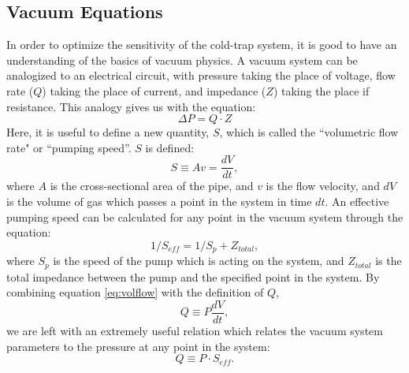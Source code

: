 \documentclass[12pt]{article}
\begin{document}
\subsection{Vacuum Equations}
In order to optimize the sensitivity of the cold-trap system, it is good to have an understanding of the basics of vacuum physics. A vacuum system can be analogized to an electrical circuit, with pressure taking the place of voltage, flow rate ($Q$) taking the place of current, and impedance ($Z$) taking the place if resistance.  This analogy gives us with the equation:
\begin{equation}
\label{eq:vaclaw1}
\Delta P = Q\cdot Z
\end{equation} 
Here, it is useful to define a new quantity, $S$, which is called the ``volumetric flow rate" or ``pumping speed''. $S$ is defined: 
\begin{equation}
\label{ep:volflow}
S \equiv Av = \frac{dV}{dt}, 
\end{equation}
where $A$ is the cross-sectional area of the pipe, and $v$ is the flow velocity, and $dV$ is the volume of gas which passes a point in the system in time $dt$. An effective pumping speed can be calculated for any point in the vacuum system through the equation:
\begin{equation}
\label{ep:vacimp}
1/S_{eff} = 1/S_{p}+Z_{total}, 
\end{equation}
where $S_{p}$ is the speed of the pump which is acting on the system, and $Z_{total}$ is the total impedance between the pump and the specified point in the system. By combining equation \ref{eq:volflow} with the definition of $Q$,
\begin{equation}
\label{ep:vacflow}
Q \equiv P\frac{dV}{dt},
\end{equation}
we are left with an extremely useful relation which relates the vacuum system parameters to the pressure at any point in the system\cite{vac_eq}:
\begin{equation}
\label{eq:vaclaw2}
Q \equiv P\cdot S_{eff}.
\end{equation}
\end{document}
